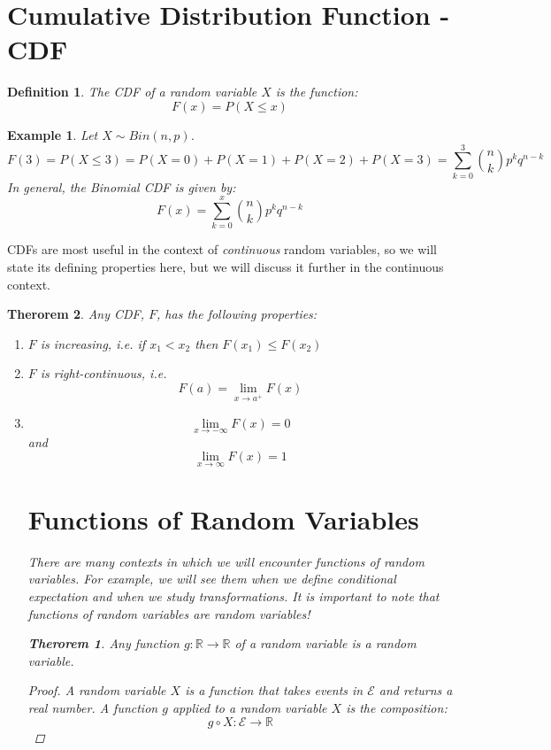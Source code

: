 \documentclass[12pt]{article} %
\newtheorem{defn}{Definition}
\newtheorem{example}{Example}
\newtheorem{thm}{Therorem}
\begin{document}
\section{Cumulative Distribution Function - CDF}
\begin{defn}
The CDF of a random variable $X$ is the function:
$$F(x) = P(X\leq x)$$
\end{defn}
\begin{example}
Let $X\sim Bin(n,p)$.
$$F(3) = P(X\leq 3) = P(X=0)+P(X=1)+P(X=2)+P(X=3) = \sum_{k=0}^3{n\choose{k}}p^kq^{n-k}$$
In general, the Binomial CDF is given by:
$$F(x) = \sum_{k=0}^x {n\choose{k}}p^kq^{n-k}$$
\end{example}
CDFs are most useful in the context of \emph{continuous} random variables, so we will state its defining properties here, but we will discuss it further in the continuous context.
\begin{thm}
Any CDF, $F$, has the following properties:
\begin{enumerate}
\item $F$ is increasing, i.e. if $x_1<x_2$ then $F(x_1)\leq F(x_2)$
\item $F$ is right-continuous, i.e.
$$F(a) = \lim_{x\rightarrow a^+} F(x)$$
\item 
$$\lim_{x\rightarrow -\infty} F(x) = 0$$
and
$$\lim_{x\rightarrow\infty} F(x) = 1$$
\section{Functions of Random Variables}
There are many contexts in which we will encounter functions of random variables. For example, we will see them when we define conditional expectation and when we study transformations. It is important to note that functions of random variables \emph{are} random variables!
\begin{thm}
Any function $g:\mathbb{R}\rightarrow\mathbb{R}$ of a random variable is a random variable.
\end{thm}
\begin{proof}
A random variable $X$ is a function that takes events in $\mathcal{E}$ and returns a real number. A function $g$ applied to a random variable $X$ is the composition: 
$$g\circ X:\mathcal{E}\rightarrow \mathbb{R}$$
\end{proof}
\end{enumerate}
\end{thm}
\end{document}
